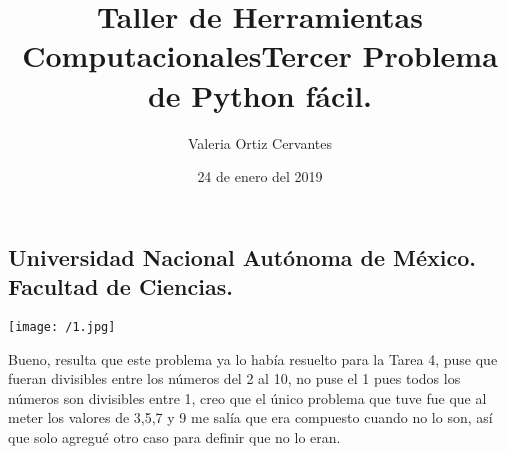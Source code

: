 \documentclass{article} %
\title{\Huge Taller de Herramientas Computacionales}
\author{\huge Valeria Ortiz Cervantes}
\date{\LARGE 24 de enero del 2019}
\begin{document}
\maketitle
\begin{center}
	\subsection*{\LARGE Universidad Nacional Autónoma de México.\\Facultad de Ciencias.\\}
	\texttt{[image: /1.jpg]}
\end{center}
\newpage
\title{\LARGE Tercer Problema de Python fácil.\\}
Bueno, resulta que este problema ya lo había resuelto para la Tarea 4, puse que fueran divisibles entre los números del 2 al 10, no puse el 1 pues todos los números son divisibles entre 1, creo que el único problema que tuve fue que al meter los valores de 3,5,7 y 9 me salía que era compuesto cuando no lo son, así que solo agregué otro caso para definir que no lo eran.
\end{document}
